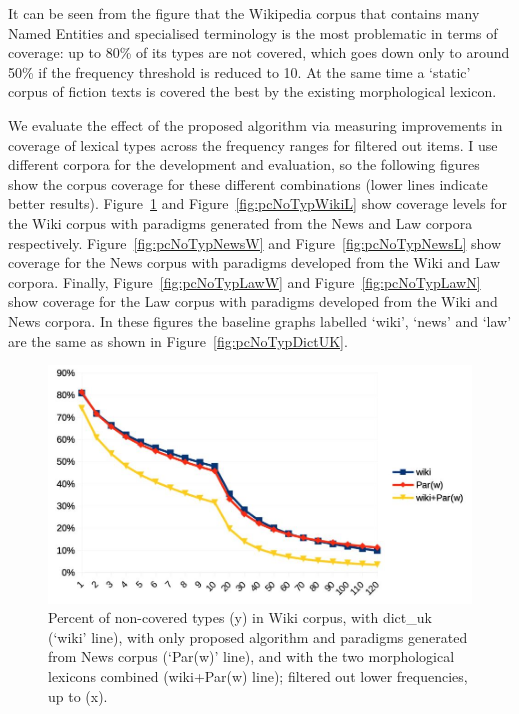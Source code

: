 \documentclass[11pt,a4paper]{article}
\begin{document}
It can be seen from the figure that the Wikipedia corpus that contains many Named Entities and specialised terminology is the most problematic in terms of coverage: up to 80\% of its types are not covered, which goes down only to around 50\% if the frequency threshold is reduced to 10. At the same time a `static' corpus of fiction texts is covered the best by the existing morphological lexicon.

We evaluate the effect of the proposed algorithm via measuring improvements in coverage of lexical types across the frequency ranges for filtered out items. I use different corpora for the development and evaluation, so the following figures show the corpus coverage for these different combinations (lower lines indicate better results). Figure~\ref{fig:pcNoTypWikiN} and Figure~\ref{fig:pcNoTypWikiL} show coverage levels for the Wiki corpus with paradigms generated from the News and Law corpora respectively. Figure~\ref{fig:pcNoTypNewsW} and Figure~\ref{fig:pcNoTypNewsL} show coverage for the News corpus with paradigms developed from the Wiki and Law corpora. Finally, Figure~\ref{fig:pcNoTypLawW} and Figure~\ref{fig:pcNoTypLawN} show coverage for the Law corpus with paradigms developed from the Wiki and News corpora. In these figures the baseline graphs labelled `wiki', `news' and `law' are the same as shown in Figure~\ref{fig:pcNoTypDictUK}.

\begin{figure}
	\includegraphics[width=\linewidth]{evaluation-coverage-wikiN.jpg}
	\caption{Percent of non-covered types (y) in Wiki corpus, with dict\_uk (`wiki' line), with only proposed algorithm and paradigms generated from News corpus (`Par(w)' line), and with the two morphological lexicons combined (wiki+Par(w) line); filtered out lower frequencies, up to (x).}
	\label{fig:pcNoTypWikiN}
\end{figure}
\end{document}
